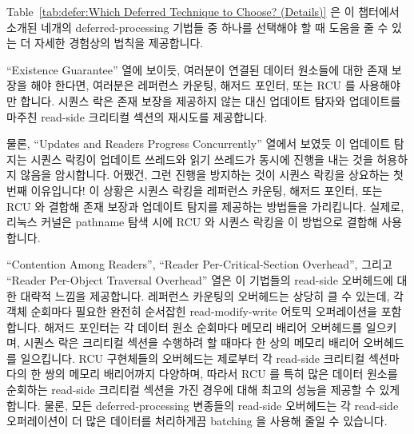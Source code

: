 Table~\ref{tab:defer:Which Deferred Technique to Choose? (Details)}
은 이 챕터에서 소개된 네개의 deferred-processing 기법들 중 하나를 선택해야 할
때 도움을 줄 수 있는 더 자세한 경험상의 법칙을 제공합니다.

``Existence Guarantee'' 열에 보이듯, 여러분이 연결된 데이터 원소들에 대한 존재
보장을 해야 한다면, 여러분은 레퍼런스 카운팅, 해저드 포인터, 또는 RCU 를
사용해야만 합니다.
시퀀스 락은 존재 보장을 제공하지 않는 대신 업데이트 탐자와 업데이트를 마주친
read-side 크리티컬 섹션의 재시도를 제공합니다.

물론, ``Updates and Readers Progress Concurrently'' 열에서 보였듯 이 업데이트
탐지는 시퀀스 락킹이 업데이트 쓰레드와 읽기 쓰레드가 동시에 진행을 내는 것을
허용하지 않음을 암시합니다.
어쨌건, 그런 진행을 방지하는 것이 시퀀스 락킹을 상요하는 첫번째 이유입니다!
이 상황은 시퀀스 락킹을 레퍼런스 카운팅, 해저드 포인터, 또는 RCU 와 결합해 존재
보장과 업데이트 탐지를 제공하는 방법들을 가리킵니다.
실제로, 리눅스 커널은 pathname 탐색 시에 RCU 와 시퀀스 락킹을 이 방법으로
결합해 사용합니다.

\iffalse

Table~\ref{tab:defer:Which Deferred Technique to Choose? (Details)}
provides more-detailed rules of thumb that can help you choose among the
four deferred-processing techniques presented in this chapter.

As shown in the ``Existence Guarantee'' row,
if you need existence guarantees for linked
data elements, you must use reference counting, hazard pointers, or RCU\@.
Sequence locks do not provide existence guarantees, instead providing
detection of updates, retrying any read-side critical sections
that do encounter an update.

Of course, as shown in the ``Updates and Readers Progress Concurrently''
row, this detection of updates implies
that sequence locking does not permit updaters and readers to make forward
progress concurrently.
After all, preventing such forward progress is the whole point of using
sequence locking in the first place!
This situation points the way to using sequence locking in conjunction
with reference counting, hazard pointers, or RCU in order to provide
both existence guarantees and update detection.
In fact, the Linux kernel combines RCU and sequence locking in
this manner during pathname lookup.

\fi

``Contention Among Readers'', ``Reader Per-Critical-Section Overhead'',
그리고 ``Reader Per-Object Traversal Overhead'' 열은 이 기법들의 read-side
오버헤드에 대한 대략적 느낌을 제공합니다.
레퍼런스 카운팅의 오버헤드는 상당히 클 수 있는데, 각 객체 순회마다 필요한
완전히 순서잡힌 read-modify-write 어토믹 오퍼레이션을 포함합니다.
해저드 포인터는 각 데이터 원소 순회마다 메모리 배리어 오버헤드를 일으키며,
시퀀스 락은 크리티컬 섹션을 수행하려 할 때마다 한 상의 메모리 배리어 오버헤드를
일으킵니다.
RCU 구현체들의 오버헤드는 제로부터 각 read-side 크리티컬 섹션마다의 한 쌍의
메모리 배리어까지 다양하며, 따라서 RCU 를 특히 많은 데이터 원소를 순회하는
read-side 크리티컬 섹션을 가진 경우에 대해 최고의 성능을 제공할 수 있게 합니다.
물론, 모든 deferred-processing 변종들의 read-side 오버헤드는 각 read-side
오퍼레이션이 더 많은 데이터를 처리하게끔 batching 을 사용해 줄일 수 있습니다.


